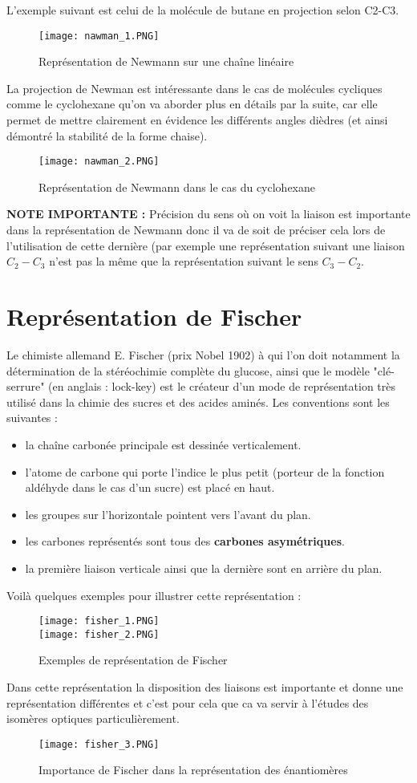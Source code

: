\documentclass[a4paper, oneside]{book}
\begin{document}
L'exemple suivant est celui de la molécule de butane en projection selon C2-C3.
\begin{figure}[!h]
    \centering
    \texttt{[image: nawman\_1.PNG]}
    \caption{Représentation de Newmann sur une chaîne linéaire}
    \label{fig:my_label}
\end{figure}
La projection de Newman est intéressante dans le cas de molécules cycliques comme le cyclohexane qu'on va aborder plus en détails par la suite, car elle permet de mettre clairement en évidence les différents angles dièdres (et ainsi démontré la stabilité de la forme chaise).
\begin{figure}[!h]
    \centering
    \texttt{[image: nawman\_2.PNG]}
    \caption{Représentation de Newmann dans le cas du cyclohexane}
    \label{fig:my_label}
\end{figure}
\textbf{NOTE IMPORTANTE :} Précision du sens où on voit la liaison est importante dans la représentation de Newmann donc il va de soit de préciser cela lors de l'utilisation de cette dernière (par exemple une représentation suivant une liaison $C_2-C_3$ n'est pas la même que la représentation suivant le sens $C_3-C_2$.
\section{Représentation de Fischer}
Le chimiste allemand E. Fischer (prix Nobel 1902) à qui l'on doit notamment la détermination de la stéréochimie complète du glucose, ainsi que le modèle "clé-serrure" (en anglais : lock-key) est le créateur d'un mode de représentation très utilisé dans la chimie des sucres et des acides aminés. Les conventions sont les suivantes :\\
\begin{itemize}
    \item la chaîne carbonée principale est dessinée verticalement.
    \item l'atome de carbone qui porte l'indice le plus petit (porteur de la fonction aldéhyde dans le cas d'un sucre) est placé en haut.
    \item les groupes sur l'horizontale pointent vers l'avant du plan.
    \item les carbones représentés sont tous des \textbf{carbones asymétriques}.
    \item la première liaison verticale ainsi que la dernière sont en arrière du plan.
\end{itemize}
Voilà quelques exemples pour illustrer cette représentation :
\begin{figure}[!h]
    \centering
    \texttt{[image: fisher\_1.PNG]}\\
    \texttt{[image: fisher\_2.PNG]}
    \caption{Exemples de représentation de Fischer}
    \label{fig:my_label}
\end{figure}
Dans cette représentation la disposition des liaisons est importante et donne une représentation différentes et c'est pour cela que ca va servir à l'études des isomères optiques particulièrement.
\begin{figure}[!h]
    \centering
    \texttt{[image: fisher\_3.PNG]}
    \caption{Importance de Fischer dans la représentation des énantiomères}
    \label{fig:my_label}
\end{figure}
\end{document}
